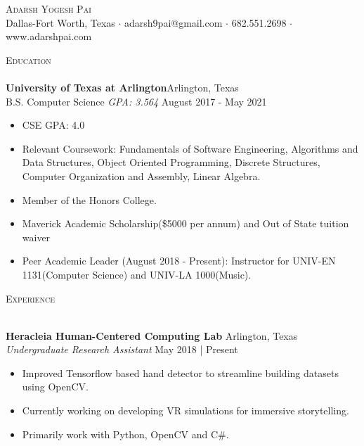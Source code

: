 \documentclass[a4paper]{article}
\newcommand{\lineunder} {
    \vspace*{-8pt} \\
    \hspace*{-18pt} \hrulefill \\
}
\newcommand{\header} [1] {
    {\hspace*{-18pt}\vspace*{6pt} \textsc{#1}}
    \vspace*{-6pt} \lineunder
}
\begin{document}
\vspace*{-40pt}

    


\vspace*{-10pt}
\begin{center}
	{\Huge \scshape {Adarsh Yogesh Pai}}\\
	Dallas-Fort Worth, Texas $\cdot$ adarsh9pai@gmail.com $\cdot$ 682.551.2698 $\cdot$ www.adarshpai.com\\
\end{center}

\header{Education}
\textbf{University of Texas at Arlington}\hfill Arlington, Texas\\
B.S. Computer Science \textit{GPA: 3.564} \hfill August 2017 - May 2021\\

\begin{itemize} \itemsep 1pt
	\item CSE GPA: 4.0
	\item Relevant Coursework: Fundamentals of Software Engineering, Algorithms and Data Structures, Object Oriented Programming, Discrete Structures, Computer Organization and Assembly, Linear Algebra.
	\item Member of the Honors College.
	\item Maverick Academic Scholarship(\$5000 per annum) and Out of State tuition waiver
         \item Peer Academic Leader (August 2018 - Present): Instructor for UNIV-EN 1131(Computer Science) and UNIV-LA 1000(Music).
\end{itemize}
\vspace{2mm}
\header{Experience}
\vspace{1mm}

\textbf{Heracleia Human-Centered Computing Lab} \hfill Arlington, Texas\\
\textit{Undergraduate Research Assistant} \hfill May 2018 | Present\\
\vspace{-1mm}
\begin{itemize} \itemsep 1pt
	\item Improved Tensorflow based hand detector to streamline building datasets using OpenCV.
	\item Currently working on developing VR simulations for immersive storytelling.
	\item Primarily work with Python, OpenCV and C\#.
\end{itemize}
\end{document}
